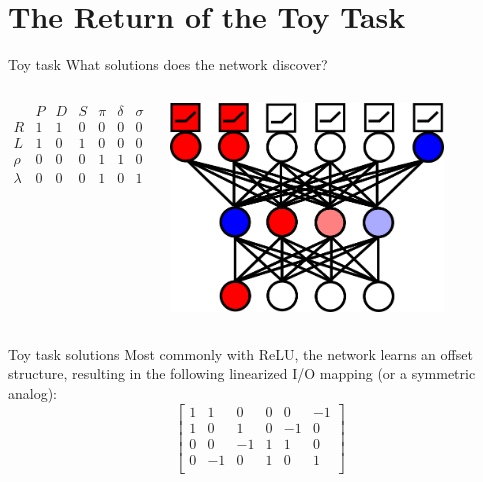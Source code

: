 \documentclass{beamer}
\begin{document}
\section{The Return of the Toy Task}
\begin{frame}{Toy task}
What solutions does the network discover?
\begin{columns}
	    \[
	    \begin{array}{c|cccccc} 
	    & P & D & S & \pi & \delta & \sigma \\
	    \hline
	    R & 1 & 1 & 0 & 0 & 0 & 0 \\
	    L & 1 & 0 & 1 & 0 & 0 & 0 \\
	    \rho & 0 & 0 & 0 & 1 & 1 & 0\\
	    \lambda & 0 & 0 & 0 & 1 & 0 & 1\\
	    \end{array} 
	    \]
	\begin{center}
	    \includegraphics[width=0.8\textwidth]{../writing/cogsci_2017/figures/network_diagram.png}
	\end{center}
\end{columns}
\end{frame}

\begin{frame}{Toy task solutions}
Most commonly with ReLU, the network learns an offset structure, resulting in the following linearized I/O mapping (or a symmetric analog): 
\[
\left[ \begin{matrix} 
1 & 1 & 0 & 0 & 0 & -1 \\
1 & 0 & 1 & 0 & -1 & 0 \\
 0 & 0 & -1 & 1 & 1 & 0\\
 0 & -1 & 0 & 1 & 0 & 1\\
\end{matrix}  \right] 
\]
\end{frame}
\end{document}
